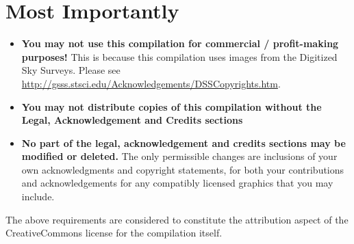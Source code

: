 \section*{Most Importantly}
\begin{itemize}
\item \textbf{You may not use this compilation for commercial / profit-making
  purposes!}  This is because this compilation uses images from the
  Digitized Sky Surveys. Please see
  \url{http://gsss.stsci.edu/Acknowledgements/DSSCopyrights.htm}.
\item \textbf{You may not distribute copies of this compilation
  without the Legal, Acknowledgement and Credits sections}
\item \textbf{No part of the legal, acknowledgement and credits
  sections may be modified or deleted.} The only permissible changes
  are inclusions of your own acknowledgments and copyright statements,
  for both your contributions and acknowledgements for any compatibly
  licensed graphics that you may include.
\end{itemize}
The above requirements are considered to constitute the attribution
aspect of the CreativeCommons license for the compilation itself.

